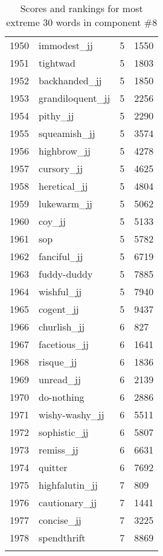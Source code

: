\begin{longtable}[!htbp]{| rlr@{.}l |}
    1950 & immodest\_jj & 5 & 1550 \\
    1951 & tightwad & 5 & 1803 \\
    1952 & backhanded\_jj & 5 & 1850 \\
    1953 & grandiloquent\_jj & 5 & 2256 \\
    1954 & pithy\_jj & 5 & 2290 \\
    1955 & squeamish\_jj & 5 & 3574 \\
    1956 & highbrow\_jj & 5 & 4278 \\
    1957 & cursory\_jj & 5 & 4625 \\
    1958 & heretical\_jj & 5 & 4804 \\
    1959 & lukewarm\_jj & 5 & 5062 \\
    1960 & coy\_jj & 5 & 5133 \\
    1961 & sop & 5 & 5782 \\
    1962 & fanciful\_jj & 5 & 6719 \\
    1963 & fuddy-duddy & 5 & 7885 \\
    1964 & wishful\_jj & 5 & 7940 \\
    1965 & cogent\_jj & 5 & 9437 \\
    1966 & churlish\_jj & 6 & 827 \\
    1967 & facetious\_jj & 6 & 1641 \\
    1968 & risque\_jj & 6 & 1836 \\
    1969 & unread\_jj & 6 & 2139 \\
    1970 & do-nothing & 6 & 2886 \\
    1971 & wishy-washy\_jj & 6 & 5511 \\
    1972 & sophistic\_jj & 6 & 5807 \\
    1973 & remiss\_jj & 6 & 6631 \\
    1974 & quitter & 6 & 7692 \\
    1975 & highfalutin\_jj & 7 & 809 \\
    1976 & cautionary\_jj & 7 & 1441 \\
    1977 & concise\_jj & 7 & 3225 \\
    1978 & spendthrift & 7 & 8869 \\
    \hline
    \caption{Scores and rankings for most extreme 30 words in component \#8} \\
\end{longtable}
